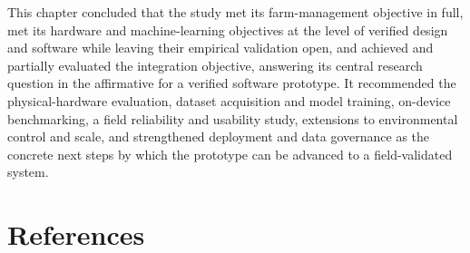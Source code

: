 \documentclass[12pt,a4paper]{report}
\begin{document}
This chapter concluded that the study met its farm-management objective in full, met its hardware and machine-learning objectives at the level of verified design and software while leaving their empirical validation open, and achieved and partially evaluated the integration objective, answering its central research question in the affirmative for a verified software prototype. It recommended the physical-hardware evaluation, dataset acquisition and model training, on-device benchmarking, a field reliability and usability study, extensions to environmental control and scale, and strengthened deployment and data governance as the concrete next steps by which the prototype can be advanced to a field-validated system.

\clearpage
\chapter*{References}
\end{document}
